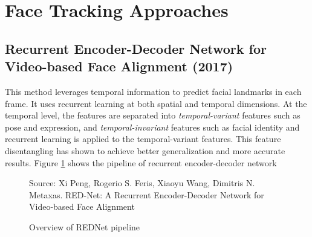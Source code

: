 \documentclass{llncs}
\begin{document}
\section{Face Tracking Approaches}

\subsection{Recurrent Encoder-Decoder Network for Video-based Face Alignment (2017) \cite{rednet}}

This method leverages temporal information to predict facial landmarks in each frame. It uses recurrent learning at both spatial and temporal dimensions. At the temporal level, the features are separated into \textit{temporal-variant} features such as pose and expression, and \textit{temporal-invariant} features such as facial identity and recurrent learning is applied to the temporal-variant features. This feature disentangling has shown to achieve better generalization and more accurate results. Figure \ref{rednet_architecture} shows the pipeline of recurrent encoder-decoder network \\

\begin{figure}
%
{Source: Xi Peng, Rogerio S. Feris, Xiaoyu Wang, Dimitris N. Metaxas. RED-Net: A Recurrent Encoder-Decoder Network for Video-based Face Alignment}
\caption{Overview of REDNet pipeline}
\label{rednet_architecture}
\end{figure}
\end{document}
